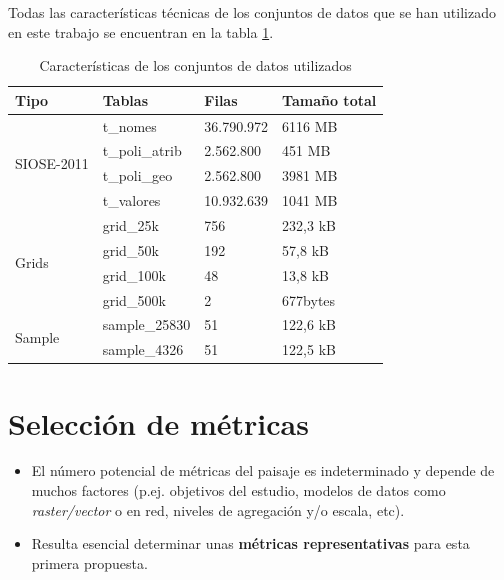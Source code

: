 Todas las características técnicas de los conjuntos de datos que se han utilizado en este trabajo se encuentran en la tabla \ref{tab:datos}.

\begin{table}[]
\centering
\caption{Características de los conjuntos de datos utilizados\label{tab:datos}}
\begin{tabular}{@{}llll@{}}
\toprule
\textbf{Tipo}               & \textbf{Tablas} & \textbf{Filas} & \textbf{Tamaño total} \\ \midrule
\multirow{4}{*}{SIOSE-2011} & t\_nomes        & 36.790.972     & 6116 MB               \\
                            & t\_poli\_atrib  & 2.562.800      & 451 MB                \\
                            & t\_poli\_geo    & 2.562.800      & 3981 MB               \\
                            & t\_valores      & 10.932.639     & 1041 MB               \\ \midrule
\multirow{4}{*}{Grids}      & grid\_25k       & 756            & 232,3 kB              \\
                            & grid\_50k       & 192            & 57,8 kB               \\
                            & grid\_100k      & 48             & 13,8 kB               \\
                            & grid\_500k      & 2              & 677bytes              \\ \midrule
\multirow{2}{*}{Sample}     & sample\_25830   & 51             & 122,6 kB              \\
                            & sample\_4326    & 51             & 122,5 kB              \\ \bottomrule
\end{tabular}
\end{table}


\section{Selección de métricas}

\begin{graybox}
\begin{itemize}
\item El número potencial de métricas del paisaje es indeterminado y depende de muchos factores (p.ej. objetivos del estudio, modelos de datos como \textit{raster/vector} o en red, niveles de agregación y/o escala, etc).
\item Resulta esencial determinar unas \textbf{métricas representativas} para esta primera propuesta.
\end{itemize}
\end{graybox}

